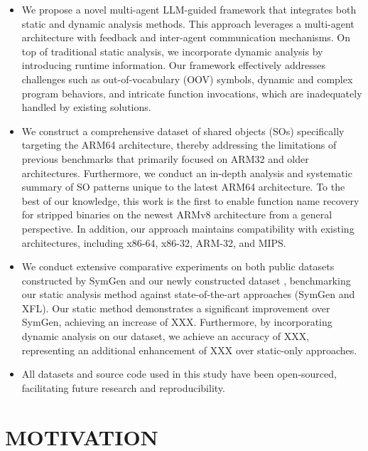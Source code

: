 \documentclass[acmsmall,screen,review,anonymous]{acmart} %
\begin{document}
\begin{itemize}
    \item We propose a novel multi-agent LLM-guided framework that integrates both static and dynamic analysis methods. This approach leverages a multi-agent architecture with feedback and inter-agent communication mechanisms. On top of traditional static analysis, we incorporate dynamic analysis by introducing runtime information. Our framework effectively addresses challenges such as out-of-vocabulary (OOV) symbols, dynamic and complex program behaviors, and intricate function invocations, which are inadequately handled by existing solutions.
    \item We construct a comprehensive dataset of shared objects (SOs) specifically targeting the ARM64 architecture, thereby addressing the limitations of previous benchmarks that primarily focused on ARM32 and older architectures. Furthermore, we conduct an in-depth analysis and systematic summary of SO patterns unique to the latest ARM64 architecture. To the best of our knowledge, this work is the first to enable function name recovery for stripped binaries on the newest ARMv8 architecture from a general perspective. In addition, our approach maintains compatibility with existing architectures, including x86-64, x86-32, ARM-32, and MIPS.
    \item We conduct extensive comparative experiments on both public datasets constructed by SymGen and our newly constructed dataset , benchmarking our static analysis method against state-of-the-art approaches (SymGen and XFL). Our static method demonstrates a significant improvement over SymGen, achieving an increase of XXX. Furthermore, by incorporating dynamic analysis on our dataset, we achieve an accuracy of XXX, representing an additional enhancement of XXX over static-only approaches.
    \item All datasets and source code used in this study have been open-sourced, facilitating future research and reproducibility.
\end{itemize}

\section{MOTIVATION}

\end{document}
